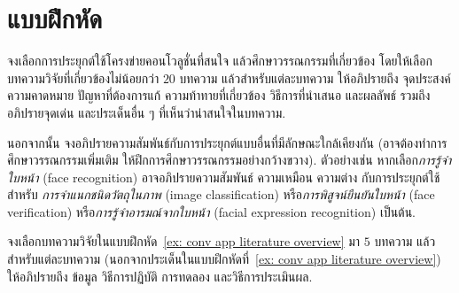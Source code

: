 \section{แบบฝึกหัด}
\label{section: conv app exercises}


\begin{Parallel}[c]{0.52\textwidth}{0.38\textwidth}
\end{Parallel}


\begin{Exercise}
	\label{ex: conv app literature overview}
จงเลือกการประยุกต์ใช้โครงข่ายคอนโวลูชั่นที่สนใจ แล้วศึกษาวรรณกรรมที่เกี่ยวข้อง
โดยให้เลือกบทความวิจัยที่เกี่ยวข้องไม่น้อยกว่า $20$ บทความ 
แล้วสำหรับแต่ละบทความ ให้อภิปรายถึง 
จุดประสงค์ ความคาดหมาย ปัญหาที่ต้องการแก้ ความท้าทายที่เกี่ยวข้อง วิธีการที่นำเสนอ และผลลัพธ์ 
รวมถึงอภิปรายจุดเด่น และประเด็นอื่น ๆ ที่เห็นว่าน่าสนใจในบทความ.

นอกจากนั้น จงอภิปรายความสัมพันธ์กับการประยุกต์แบบอื่นที่มีลักษณะใกล้เคียงกัน (อาจต้องทำการศึกษาวรรณกรรมเพิ่มเติม ให้ฝึกการศึกษาวรรณกรรมอย่างกว้างขวาง).
ตัวอย่างเช่น หากเลือก\textit{การรู้จำใบหน้า} (face recognition)
อาจอภิปรายความสัมพันธ์ ความเหมือน ความต่าง กับการประยุกต์ใช้สำหรับ 
\textit{การจำแนกชนิดวัตถุในภาพ} (image classification)
หรือ\textit{การพิสูจน์ยืนยันใบหน้า} (face verification)
หรือ\textit{การรู้จำอารมณ์จากใบหน้า} (facial expression recognition)
เป็นต้น.
	
\end{Exercise}

\begin{Exercise}
	\label{ex: conv app literature}

จงเลือกบทความวิจัยในแบบฝึกหัด~\ref{ex: conv app literature overview}
มา $5$ บทความ แล้วสำหรับแต่ละบทความ 
(นอกจากประเด็นในแบบฝึกหัดที่~\ref{ex: conv app literature overview})
ให้อภิปรายถึง 
ข้อมูล วิธีการปฏิบัติ การทดลอง และวิธีการประเมินผล.
	
\end{Exercise}

